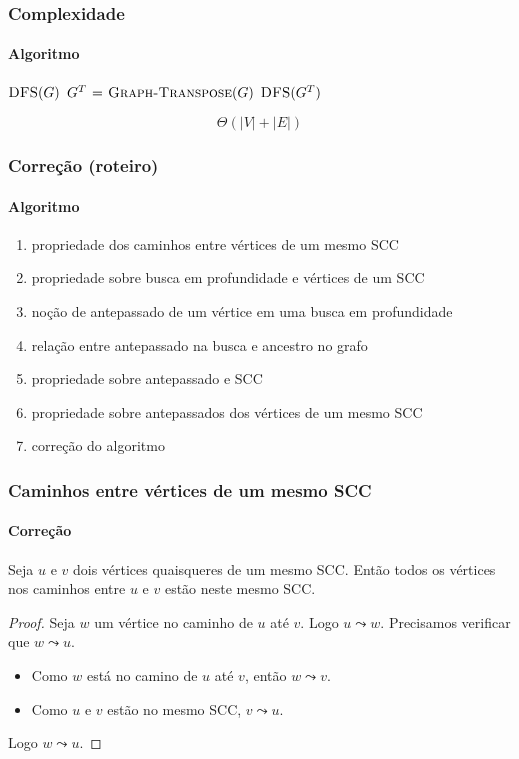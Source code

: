 \documentclass{beamer}
\begin{document}

\begin{frame}
\frametitle{Complexidade}
\framesubtitle{Algoritmo}

\begin{codebox}
\li $\textnormal{\scshape DFS}(G)$ 
\li $G^T \mathrel{\hspace{1pt}=\hspace{1pt}} \textnormal{\scshape Graph-Transpose}(G)$ 
\li $\textnormal{\scshape DFS}(G^T)$ 
\end{codebox}
\pause
$$
\Theta(|V|+|E|)
$$
\end{frame}


\begin{frame}
\frametitle{Correção (roteiro)}
\framesubtitle{Algoritmo}

\begin{enumerate}
\item propriedade dos caminhos entre vértices de um mesmo SCC
\item propriedade sobre busca em profundidade e vértices de um SCC
\item noção de \alert{antepassado} de um vértice em uma busca em profundidade
\item relação entre antepassado na busca e ancestro no grafo
\item propriedade sobre antepassado e SCC
\item propriedade sobre antepassados dos vértices de um mesmo SCC
\item correção do algoritmo
\end{enumerate}
\end{frame}


\begin{frame}
\frametitle{Caminhos entre vértices de um mesmo SCC}
\framesubtitle{Correção}

\begin{lemma}
Seja $u$ e $v$ dois vértices quaisqueres de um mesmo SCC. Então todos
os vértices nos caminhos entre $u$ e $v$ estão neste mesmo SCC.
\end{lemma}
\pause
\begin{proof}
Seja $w$ um vértice no caminho de $u$ até $v$. Logo $u \leadsto w$. Precisamos verificar que $w \leadsto u$.
\begin{itemize}
\item Como $w$ está no camino de $u$ até $v$, então $w \leadsto v$.
\item Como $u$ e $v$ estão no mesmo SCC, $v \leadsto u$.
\end{itemize}
Logo $w \leadsto u$.
\end{proof}
\end{frame}
\end{document}
